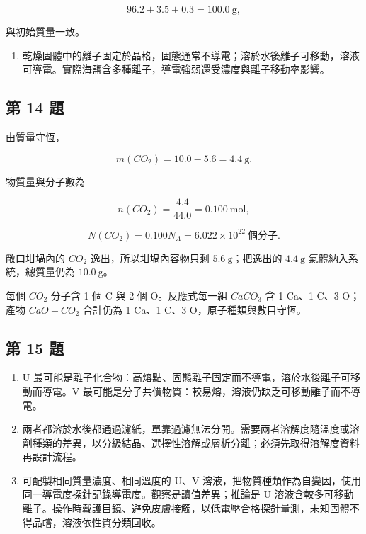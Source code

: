 \documentclass[11pt,a4paper]{article}
\providecommand{\tightlist}{%
  \setlength{\itemsep}{0pt}\setlength{\parskip}{0pt}}
\begin{document}
\[
96.2+3.5+0.3=100.0\ \mathrm g,
\]

與初始質量一致。

\begin{enumerate}
\def\labelenumi{\arabic{enumi}.}
\setcounter{enumi}{3}
\tightlist
\item
  乾燥固體中的離子固定於晶格，固態通常不導電；溶於水後離子可移動，溶液可導電。實際海鹽含多種離子，導電強弱還受濃度與離子移動率影響。
\end{enumerate}

\subsection{第 14 題}\label{ux7b2c-14-ux984c}

由質量守恆，

\[
m(CO_2)=10.0-5.6=\boxed{4.4\ \mathrm g}.
\]

物質量與分子數為

\[
n(CO_2)=\frac{4.4}{44.0}=0.100\ \mathrm{mol},
\]

\[
N(CO_2)=0.100N_A=\boxed{6.022\times10^{22}\ \text{個分子}}.
\]

敞口坩堝內的 \(CO_2\) 逸出，所以坩堝內容物只剩 \(5.6\ \mathrm g\)；把逸出的 \(4.4\ \mathrm g\) 氣體納入系統，總質量仍為 \(10.0\ \mathrm g\)。

每個 \(CO_2\) 分子含 1 個 C 與 2 個 O。反應式每一組 \(CaCO_3\) 含 1 Ca、1 C、3 O；產物 \(CaO+CO_2\) 合計仍為 1 Ca、1 C、3 O，原子種類與數目守恆。

\subsection{第 15 題}\label{ux7b2c-15-ux984c}

\begin{enumerate}
\def\labelenumi{\arabic{enumi}.}
\tightlist
\item
  U 最可能是離子化合物：高熔點、固態離子固定而不導電，溶於水後離子可移動而導電。V 最可能是分子共價物質：較易熔，溶液仍缺乏可移動離子而不導電。
\item
  兩者都溶於水後都通過濾紙，單靠過濾無法分開。需要兩者溶解度隨溫度或溶劑種類的差異，以分級結晶、選擇性溶解或層析分離；必須先取得溶解度資料再設計流程。
\item
  可配製相同質量濃度、相同溫度的 U、V 溶液，把物質種類作為自變因，使用同一導電度探針記錄導電度。觀察是讀值差異；推論是 U 溶液含較多可移動離子。操作時戴護目鏡、避免皮膚接觸，以低電壓合格探針量測，未知固體不得品嚐，溶液依性質分類回收。
\end{enumerate}
\end{document}

